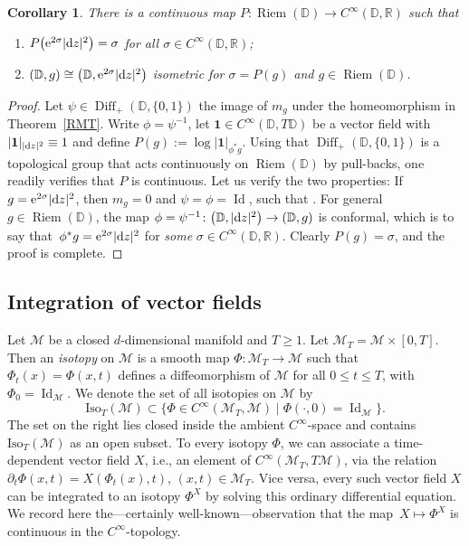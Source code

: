 \documentclass[pdftex]{sigma}
\numberwithin{equation}{section}
\newtheorem{Corollary}[Theorem]{Corollary}
\theoremstyle{definition}
\newcommand{\R}{\mathbb{R}} %
\newcommand{\DD}{\mathbb{D}} %
\newcommand{\1}{{\bf 1}}
\newcommand{\Id}{\operatorname{Id}}
\DeclareMathOperator{\Diff}{Diff}
\DeclareMathOperator{\Riem}{Riem}
\begin{document}
\begin{Corollary}\label{cor_rmt}
There is a continuous map $P\colon \Riem(\DD)\rightarrow C^\infty(\DD,\R)$ such that
\begin{enumerate}[label=\rm(\roman*)]\itemsep=0pt
	\item $P\bigl({\rm e}^{2\sigma}|{\rm d}z|^2\bigr)=\sigma$ for all $\sigma\in C^\infty(\DD,\R)$;
	
	\item $(\DD,g) \cong \bigl(\DD,{\rm e}^{2\sigma}|{\rm d}z|^2\bigr)$ isometric for $\sigma=P(g)$ and $g\in \Riem(\DD)$.
\end{enumerate}
\end{Corollary}

\begin{proof}
Let $\psi \in \Diff_+(\DD,\{0,1\})$ the image of $m_g$ under the homeomorphism in Theorem~\ref{RMT}. Write $\phi=\psi^{-1}$, let $\mathbf 1\in C^\infty(\DD,T\DD)$ be a vector field with $|\mathbf 1|_{|{\rm d}z|^2}\equiv 1$ and define
$
	P(g) := \log |\mathbf 1|_{\phi^*g}.
$ Using that $\Diff_+(\DD,\{0,1\})$ is a topological group that acts continuously on $\Riem(\DD)$ by pull-backs, one readily verifies that $P$ is continuous.
Let us verify the two properties: If~${g={\rm e}^{2\sigma}|{\rm d}z|^2}$, then $m_g=0$ and $\psi=\phi=\Id$, such that . For general $g\in \Riem(\DD)$, the map $\phi=\psi^{-1}\colon \bigl(\DD,|{\rm d}z|^2\bigr) \rightarrow (\DD,g)$ is conformal, which is to say that~${\phi^*g={\rm e}^{2\sigma}|{\rm d}z|^2}$ for {\it some} $\sigma\in C^\infty(\DD,\R)$. Clearly $P(g)=\sigma$, and the proof is complete.
\end{proof}


\subsection{Integration of vector fields} Let $\mathcal M$ be a closed $d$-dimensional manifold and $T\ge 1$. Let $\mathcal M_T=\mathcal M\times [0,T]$. Then an {\it isotopy} on $\mathcal M$ is a smooth map $\Phi\colon \mathcal M_T\rightarrow \mathcal M$
such that $\Phi_t(x)=\Phi(x,t)$ defines a diffeomorphism of $\mathcal M$ for all $0\le t \le T$, with $\Phi_0=\operatorname{Id}_\mathcal M$. We denote the set of all isotopies on $\mathcal M$ by
\[
	\mathrm{Iso}_T(\mathcal M) \subset \{\Phi\in C^\infty(\mathcal M_T,\mathcal M)\mid \Phi(\cdot,0)=\Id_\mathcal M\}.
\]
The set on the right lies closed inside the ambient $C^\infty$-space and contains $\mathrm{Iso}_T(\mathcal M)$ as an open subset.
To every isotopy $\Phi$, we can associate a time-dependent vector field $X$, i.e., an element of $C^\infty(\mathcal M_T,T\mathcal M)$, via the relation
$\partial_t \Phi(x,t) = X(\Phi_t(x),t)$, $ (x,t)\in \mathcal M_T$.
Vice versa, every such vector field $X$ can be integrated to an isotopy $\Phi^X$ by solving this ordinary differential equation. We record here the---certainly well-known---observation that the map~${X\mapsto \Phi^X}$ is continuous in the $C^\infty$-topology.
\end{document}
